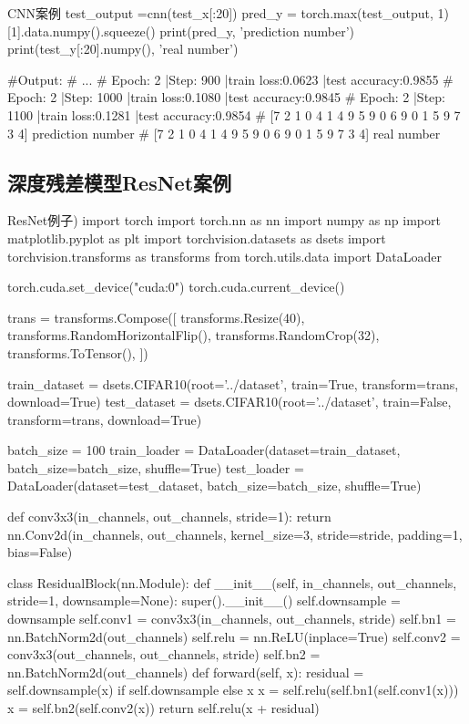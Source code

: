 \documentclass[openbib]{article}
\begin{document}
\begin{Python}{CNN案例}
test_output =cnn(test_x[:20])
pred_y = torch.max(test_output, 1)[1].data.numpy().squeeze()
print(pred_y, 'prediction number')
print(test_y[:20].numpy(), 'real number')

#Output:
#       ...
#		Epoch: 2 |Step: 900 |train loss:0.0623 |test accuracy:0.9855
#		Epoch: 2 |Step: 1000 |train loss:0.1080 |test accuracy:0.9845
#		Epoch: 2 |Step: 1100 |train loss:0.1281 |test accuracy:0.9854
#		[7 2 1 0 4 1 4 9 5 9 0 6 9 0 1 5 9 7 3 4] prediction number
#		[7 2 1 0 4 1 4 9 5 9 0 6 9 0 1 5 9 7 3 4] real number

\end{Python}
\subsection{深度残差模型ResNet案例}
\begin{Python}{ResNet例子})
import torch
import torch.nn as nn
import numpy as np
import matplotlib.pyplot as plt
import torchvision.datasets as dsets
import torchvision.transforms as transforms
from torch.utils.data import DataLoader

torch.cuda.set_device("cuda:0")
torch.cuda.current_device()

trans = transforms.Compose([
transforms.Resize(40),
transforms.RandomHorizontalFlip(),
transforms.RandomCrop(32),
transforms.ToTensor(),
])


train_dataset = dsets.CIFAR10(root='../dataset', train=True, transform=trans, download=True)
test_dataset = dsets.CIFAR10(root='../dataset', train=False, transform=trans, download=True)

batch_size = 100
train_loader = DataLoader(dataset=train_dataset, batch_size=batch_size, shuffle=True)
test_loader = DataLoader(dataset=test_dataset, batch_size=batch_size, shuffle=True)

def conv3x3(in_channels, out_channels, stride=1):
	return nn.Conv2d(in_channels, out_channels, kernel_size=3, stride=stride, padding=1, bias=False)


class ResidualBlock(nn.Module):
	def __init__(self, in_channels, out_channels, stride=1, downsample=None):
		super().__init__()
		self.downsample = downsample
		self.conv1 = conv3x3(in_channels, out_channels, stride)
		self.bn1 = nn.BatchNorm2d(out_channels)
		self.relu = nn.ReLU(inplace=True)
		self.conv2 = conv3x3(out_channels, out_channels, stride)
		self.bn2 = nn.BatchNorm2d(out_channels)
	def forward(self, x):
		residual = self.downsample(x) if self.downsample else x
		x = self.relu(self.bn1(self.conv1(x)))
		x = self.bn2(self.conv2(x))
		return self.relu(x + residual)


\end{Python}
\end{document}
